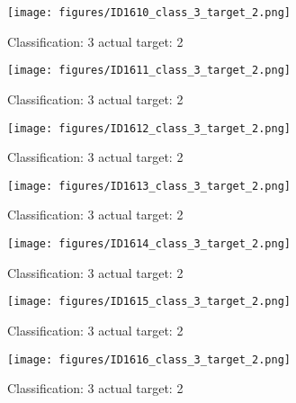\begin{figure}[h!]
\begin{center}
\texttt{[image: figures/ID1610\_class\_3\_target\_2.png]}
\end{center}
\caption{ Classification: 3 actual target: 2}
\label{fig:ID1610_class_3_target_2}
\end{figure}
\begin{figure}[h!]
\begin{center}
\texttt{[image: figures/ID1611\_class\_3\_target\_2.png]}
\end{center}
\caption{ Classification: 3 actual target: 2}
\label{fig:ID1611_class_3_target_2}
\end{figure}
\begin{figure}[h!]
\begin{center}
\texttt{[image: figures/ID1612\_class\_3\_target\_2.png]}
\end{center}
\caption{ Classification: 3 actual target: 2}
\label{fig:ID1612_class_3_target_2}
\end{figure}
\begin{figure}[h!]
\begin{center}
\texttt{[image: figures/ID1613\_class\_3\_target\_2.png]}
\end{center}
\caption{ Classification: 3 actual target: 2}
\label{fig:ID1613_class_3_target_2}
\end{figure}
\begin{figure}[h!]
\begin{center}
\texttt{[image: figures/ID1614\_class\_3\_target\_2.png]}
\end{center}
\caption{ Classification: 3 actual target: 2}
\label{fig:ID1614_class_3_target_2}
\end{figure}
\begin{figure}[h!]
\begin{center}
\texttt{[image: figures/ID1615\_class\_3\_target\_2.png]}
\end{center}
\caption{ Classification: 3 actual target: 2}
\label{fig:ID1615_class_3_target_2}
\end{figure}
\begin{figure}[h!]
\begin{center}
\texttt{[image: figures/ID1616\_class\_3\_target\_2.png]}
\end{center}
\caption{ Classification: 3 actual target: 2}
\label{fig:ID1616_class_3_target_2}
\end{figure}
